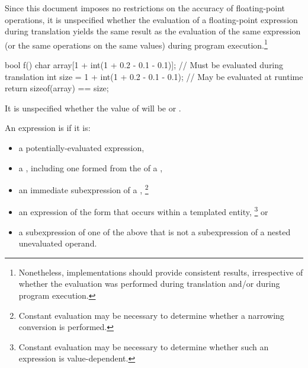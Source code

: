 \pnum
\begin{note} Since this document
imposes no restrictions on the accuracy of floating-point operations, it is unspecified whether the
evaluation of a floating-point expression during translation yields the same result as the
evaluation of the same expression (or the same operations on the same values) during program
execution.\footnote{Nonetheless, implementations should provide consistent results,
irrespective of whether the evaluation was performed during translation and/or during program
execution.} \begin{example}

\begin{codeblock}
bool f() {
    char array[1 + int(1 + 0.2 - 0.1 - 0.1)];  // Must be evaluated during translation
    int size = 1 + int(1 + 0.2 - 0.1 - 0.1);   // May be evaluated at runtime
    return sizeof(array) == size;
}
\end{codeblock}
It is unspecified whether the value of  will be  or .
\end{example} \end{note}%

\pnum
{}%
An expression is 
if it is:

\begin{itemize}
\item
a potentially-evaluated expression,

\item
a ,
including one formed from the 
of a ,

\item
an immediate subexpression of a ,%
\footnote{Constant evaluation may be necessary to determine whether a narrowing conversion is performed.}

\item
an expression of the form \tcode{\&} 
that occurs within a templated entity,%
\footnote{Constant evaluation may be necessary to determine whether such an expression is value-dependent.}
or

\item
a subexpression of one of the above
that is not a subexpression of a nested unevaluated operand.
\end{itemize}


